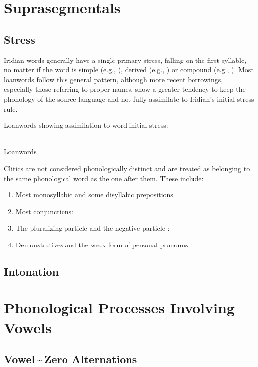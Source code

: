 \section{Suprasegmentals}

\subsection{Stress} Iridian words generally have a single primary
stress, falling on the first syllable, no matter if the word is simple (e.g.,
), derived (e.g., ) or
compound (e.g., ). Most loanwords follow this
general pattern, although more recent borrowings, especially those referring to
proper names, show a greater tendency to keep the phonology of the source
language and not fully assimilate to Iridian's initial stress rule.

\pex
\a Loanwords showing assimilation to word-initial stress:\\
\\

\a Loanwords
\xe

Clitics are not considered phonologically distinct and are treated
as belonging to the same phonological word as the one after them. These include:

\begin{enumerate}[noitemsep,label=(\alph*)]
	\item Most monosyllabic and some disyllabic prepositions
	\item Most conjunctions:
	\item The pluralizing particle  and the negative particle
	: 
	\item Demonstratives and the weak form of personal pronouns
\end{enumerate}

\subsection{Intonation}

\section{Phonological Processes Involving Vowels}

\subsection{Vowel\,\sim\,Zero Alternations}

